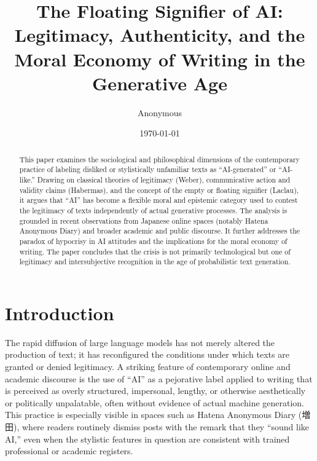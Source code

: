 \documentclass[12pt,a4paper]{article}
\title{The Floating Signifier of AI:\\Legitimacy, Authenticity, and the Moral Economy of Writing in the Generative Age}
\author{Anonymous}
\date{\today}
\begin{document}
\maketitle

\begin{abstract}
This paper examines the sociological and philosophical dimensions of the contemporary practice of labeling disliked or stylistically unfamiliar texts as ``AI-generated'' or ``AI-like.'' Drawing on classical theories of legitimacy (Weber), communicative action and validity claims (Habermas), and the concept of the empty or floating signifier (Laclau), it argues that ``AI'' has become a flexible moral and epistemic category used to contest the legitimacy of texts independently of actual generative processes. The analysis is grounded in recent observations from Japanese online spaces (notably Hatena Anonymous Diary) and broader academic and public discourse. It further addresses the paradox of hypocrisy in AI attitudes and the implications for the moral economy of writing. The paper concludes that the crisis is not primarily technological but one of legitimacy and intersubjective recognition in the age of probabilistic text generation.
\end{abstract}

\section{Introduction}

The rapid diffusion of large language models has not merely altered the production of text; it has reconfigured the conditions under which texts are granted or denied legitimacy. A striking feature of contemporary online and academic discourse is the use of ``AI'' as a pejorative label applied to writing that is perceived as overly structured, impersonal, lengthy, or otherwise aesthetically or politically unpalatable, often without evidence of actual machine generation. This practice is especially visible in spaces such as Hatena Anonymous Diary (増田), where readers routinely dismiss posts with the remark that they ``sound like AI,'' even when the stylistic features in question are consistent with trained professional or academic registers.
\end{document}
